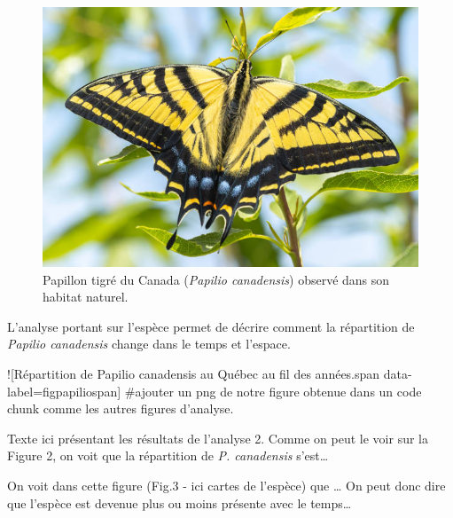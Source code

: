 \documentclass[9pt,twocolumn,twoside,]{pnas-new}
\begin{document}
\begin{figure}
\centering
\includegraphics{Papilio_canadensis.png}
\caption{Papillon tigré du Canada (\emph{Papilio canadensis}) observé
dans son habitat naturel.}
\end{figure}

L'analyse portant sur l'espèce permet de décrire comment la répartition
de \emph{Papilio canadensis} change dans le temps et l'espace.

!{[}Répartition de Papilio canadensis au Québec au fil des années.span
data-label=figpapiliospan{]} \#ajouter un png de notre figure obtenue
dans un code chunk comme les autres figures d'analyse.

Texte ici présentant les résultats de l'analyse 2. Comme on peut le voir
sur la Figure 2, on voit que la répartition de \emph{P. canadensis}
s'est\ldots{}

On voit dans cette figure (Fig.3 - ici cartes de l'espèce) que \ldots{}
On peut donc dire que l'espèce est devenue plus ou moins présente avec
le temps\ldots{}
\end{document}
